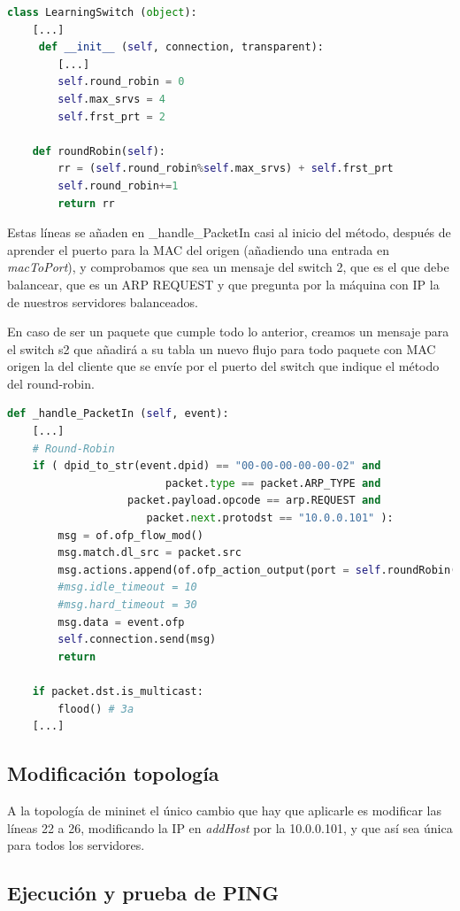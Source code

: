 \documentclass{article}
\begin{document}
\begin{lstlisting}[language=Python]
class LearningSwitch (object):
	[...]
	 def __init__ (self, connection, transparent):
		[...]
		self.round_robin = 0
		self.max_srvs = 4
		self.frst_prt = 2

	def roundRobin(self):
		rr = (self.round_robin%self.max_srvs) + self.frst_prt
		self.round_robin+=1
		return rr
\end{lstlisting}


Estas líneas se añaden en \_handle\_PacketIn casi al inicio del método, después de aprender el puerto para la MAC del origen (añadiendo una entrada en \textit{macToPort}), y comprobamos que sea un mensaje del switch 2, que es el que debe balancear, que es un ARP REQUEST y que pregunta por la máquina con IP la de nuestros servidores balanceados.

En caso de ser un paquete que cumple todo lo anterior, creamos un mensaje para el switch s2 que añadirá a su tabla un nuevo flujo para todo paquete con MAC origen la del cliente que se envíe por el puerto del switch que indique el método del round-robin.

\begin{lstlisting}[language=Python]
def _handle_PacketIn (self, event):
	[...]
	# Round-Robin
	if ( dpid_to_str(event.dpid) == "00-00-00-00-00-02" and
                         packet.type == packet.ARP_TYPE and
                   packet.payload.opcode == arp.REQUEST and
                      packet.next.protodst == "10.0.0.101" ):
		msg = of.ofp_flow_mod()
		msg.match.dl_src = packet.src
		msg.actions.append(of.ofp_action_output(port = self.roundRobin()))
		#msg.idle_timeout = 10
		#msg.hard_timeout = 30
		msg.data = event.ofp
		self.connection.send(msg)
		return

	if packet.dst.is_multicast:
		flood() # 3a
	[...]
\end{lstlisting}


\subsection{Modificación topología}

A la topología de mininet el único cambio que hay que aplicarle es modificar las líneas 22 a 26, modificando la IP en \textit{addHost} por la 10.0.0.101, y que así sea única para todos los servidores.

\subsection{Ejecución y prueba de PING}
\end{document}
